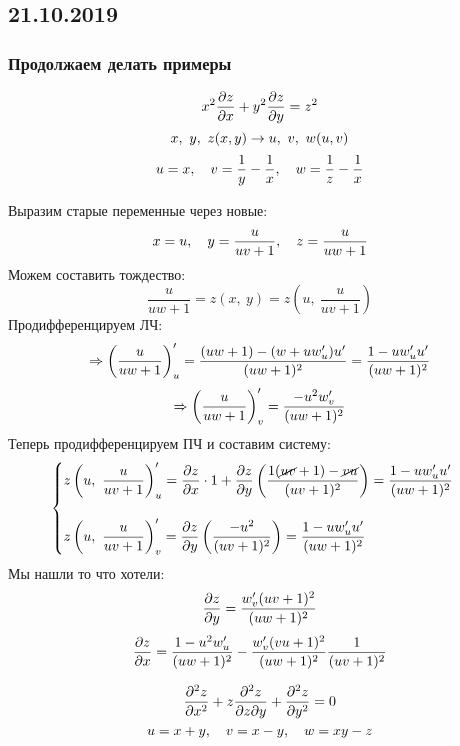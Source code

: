 \documentclass[main]{subfiles}
\begin{document}
  \subsection{21.10.2019}
  \subsubsection{Продолжаем делать примеры}

  \begin{Example}[3475]
    \[x^2 \dfrac{\partial z}{\partial x} + y^2 \dfrac{\partial z}{\partial y} = z^2\]
    \[x,\ y,\ z(x,y) \rightarrow u,\ v,\ w(u,v)\]
    \[u = x,\quad v = \dfrac{1}{y}-\dfrac{1}{x},\quad w = \dfrac{1}{z} - \dfrac{1}{x}\]
  \end{Example}

  \begin{sol}
    Выразим старые переменные через новые:
    \[x = u,\quad y = \dfrac{u}{uv + 1},\quad z = \dfrac{u}{uw + 1}\]
    Можем составить тождество:
    \[\dfrac{u}{uw + 1} = z(x,\ y) = z(u,\ \dfrac{u}{uv + 1})\]
    Продифференцируем ЛЧ:
    \[\Rightarrow \left(\dfrac{u}{uw + 1}\right)'_u = \dfrac{(uw + 1) - (w + uw'_u)u'}{(uw+1)^2} = \dfrac{1 - uw'_u u'}{(uw+1)^2}\]
    \[\Rightarrow \left(\dfrac{u}{uw + 1}\right)'_v = \dfrac{-u^2 w'_v}{(uw+1)^2}\]
    Теперь продифференцируем ПЧ и составим систему:
    \[\begin{cases}
      z \left(u,\ \dfrac{u}{uv + 1}\right)'_u = \dfrac{\partial z}{\partial x} \cdot 1 + \dfrac{\partial z}{\partial y} \left(\dfrac{1(\cancel{uv} + 1) - \cancel{vu}}{(uv + 1)^2}\right) = \dfrac{1 - uw'_u u'}{(uw+1)^2}\\ \\
      z \left(u,\ \dfrac{u}{uv + 1}\right)'_v = \dfrac{\partial z}{\partial y} \left(\dfrac{-u^2}{(uv + 1)^2}\right) = \dfrac{1 - uw'_u u'}{(uw+1)^2}
    \end{cases}\]
    Мы нашли то что хотели:
    \[\dfrac{\partial z}{\partial y} = \dfrac{w'_v (uv + 1)^2}{(uw + 1)^2}\]
    \[\dfrac{\partial z}{\partial x} = \dfrac{1-u^2 w'_u}{(uw + 1)^2} - \dfrac{w'_v (vu + 1)^2}{(uw + 1)^2} \dfrac{1}{(uv + 1)^2}\]
  \end{sol}

  \begin{Example}
    \[\dfrac{\partial^2 z}{\partial x^2} + z \dfrac{\partial^2 z}{\partial z \partial y} + \dfrac{\partial^2 z}{\partial y^2} = 0\]
    \[u = x + y,\quad v = x - y,\quad w = xy - z\]
  \end{Example}
\end{document}
